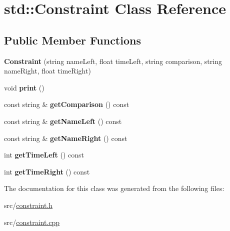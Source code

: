 \hypertarget{classstd_1_1Constraint}{\section{std\+:\+:Constraint Class Reference}
\label{classstd_1_1Constraint}
}
\subsection*{Public Member Functions}
\begin{DoxyCompactItemize}
\item 
\hypertarget{classstd_1_1Constraint_a3b977d3bf3917117d4d7a5579b0d87f5}{{\bfseries Constraint} (string name\+Left, float time\+Left, string comparison, string name\+Right, float time\+Right)}\label{classstd_1_1Constraint_a3b977d3bf3917117d4d7a5579b0d87f5}

\item 
\hypertarget{classstd_1_1Constraint_a452986d4924b22102c7a482dde72fa30}{void {\bfseries print} ()}\label{classstd_1_1Constraint_a452986d4924b22102c7a482dde72fa30}

\item 
\hypertarget{classstd_1_1Constraint_a4e8cdee5114e2c67ada3c885f11c5ebf}{const string \& {\bfseries get\+Comparison} () const }\label{classstd_1_1Constraint_a4e8cdee5114e2c67ada3c885f11c5ebf}

\item 
\hypertarget{classstd_1_1Constraint_a952816be51eb834199b4e396bb2a2f84}{const string \& {\bfseries get\+Name\+Left} () const }\label{classstd_1_1Constraint_a952816be51eb834199b4e396bb2a2f84}

\item 
\hypertarget{classstd_1_1Constraint_af307a479c48ebd0ce57c8cff6c739725}{const string \& {\bfseries get\+Name\+Right} () const }\label{classstd_1_1Constraint_af307a479c48ebd0ce57c8cff6c739725}

\item 
\hypertarget{classstd_1_1Constraint_a4b798b667449413128c3fbb3a6b031a7}{int {\bfseries get\+Time\+Left} () const }\label{classstd_1_1Constraint_a4b798b667449413128c3fbb3a6b031a7}

\item 
\hypertarget{classstd_1_1Constraint_a04c21c82e5cdc9a77fa04c0a257e64d4}{int {\bfseries get\+Time\+Right} () const }\label{classstd_1_1Constraint_a04c21c82e5cdc9a77fa04c0a257e64d4}

\end{DoxyCompactItemize}


The documentation for this class was generated from the following files\+:\begin{DoxyCompactItemize}
\item 
src/\hyperlink{constraint_8h}{constraint.\+h}\item 
src/\hyperlink{constraint_8cpp}{constraint.\+cpp}\end{DoxyCompactItemize}
